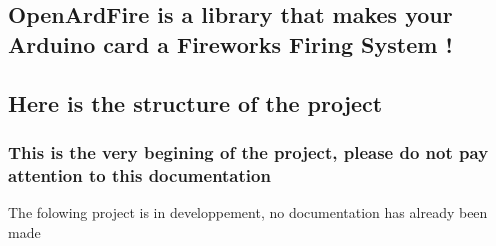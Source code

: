 \href{https://travis-ci.org/storca/OpenArdFire}{\tt } \href{https://bettercodehub.com/}{\tt } \href{https://www.codacy.com/app/storca/OpenArdFire?utm_source=github.com&amp;utm_medium=referral&amp;utm_content=storca/OpenArdFire&amp;utm_campaign=Badge_Grade}{\tt }

\subsection*{Open\+Ard\+Fire is a library that makes your Arduino card a Fireworks Firing System !}

\subsection*{Here is the structure of the project}



\subsubsection*{This is the very begining of the project, please do not pay attention to this documentation}

The folowing project is in developpement, no documentation has already been made 
